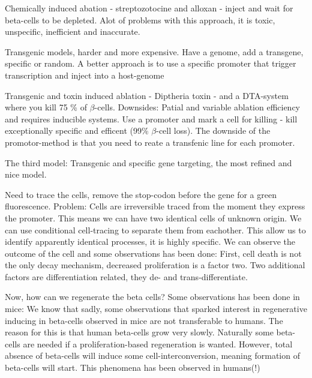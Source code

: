 \documentclass[12p]{article}
\begin{document}
Chemically induced abation - streptozotocine and alloxan - inject and wait for beta-cells to be depleted.
Alot of problems with this approach, it is toxic, unspecific, inefficient and inaccurate.

Transgenic models, harder and more expensive.
Have a genome, add a transgene, specific or random. 
A better approach is to use a specific promoter that trigger transcription and inject into a host-genome

Transgenic and toxin induced ablation - Diptheria toxin - and a DTA-system where you kill 75 \% of $\beta$-cells.
Downsides: Patial and variable ablation efficiency and requires inducible systems.
Use a promoter and mark a cell for killing - kill exceptionally specific and efficent (99\% $\beta$-cell loss).
The downside of the promotor-method is that you need to reate a transfenic line for each promoter.

The third model: Transgenic and specific gene targeting, the most refined and nice model.

Need to trace the cells, remove the stop-codon before the gene for a green fluorescence.
Problem: Cells are irreversible traced from the moment they express the promoter.
This means we can have two identical cells of unknown origin.
We can use conditional cell-tracing to separate them from eachother.
This allow us to identify apparently identical processes, it is highly specific.
We can observe the outcome of the cell and some observations has been done:
First, cell death is not the only decay mechanism, decreased proliferation is a factor two.
Two additional factors are differentiation related, they de- and trans-differentiate.

Now, how can we regenerate the beta cells?
Some observations has been done in mice:
We know that sadly, some observations that sparked interest in regenerative inducing in beta-cells observed in mice are not transferable to humans.
The reason for this is that human beta-cells grow very slowly.
Naturally some beta-cells are needed if a proliferation-based regeneration is wanted.
However, total absence of beta-cells will induce some cell-interconversion, meaning formation of beta-cells will start.
This phenomena has been observed in humans(!)
\end{document}
